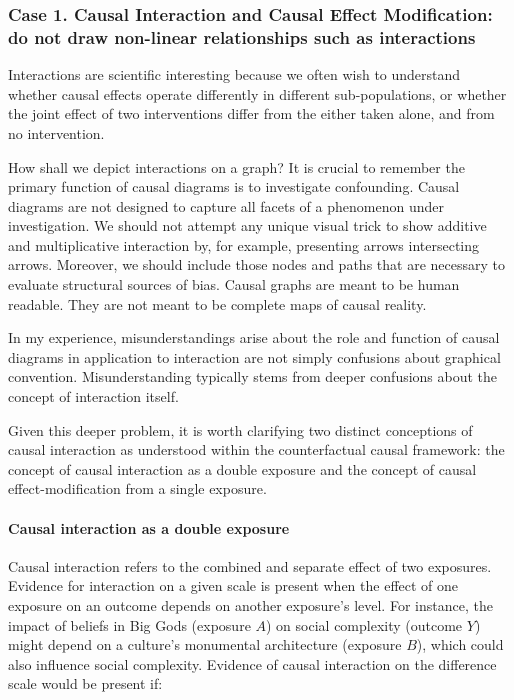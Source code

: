 \documentclass[
  singlecolumn,
  9pt]{article}
\let\oldparagraph\paragraph
\renewcommand{\paragraph}[1]{\oldparagraph{#1}\mbox{}}
\begin{document}
\subsubsection{Case 1. Causal Interaction and Causal Effect
Modification: do not draw non-linear relationships such as
interactions}\label{case-1.-causal-interaction-and-causal-effect-modification-do-not-draw-non-linear-relationships-such-as-interactions}

Interactions are scientific interesting because we often wish to
understand whether causal effects operate differently in different
sub-populations, or whether the joint effect of two interventions differ
from the either taken alone, and from no intervention.

How shall we depict interactions on a graph? It is crucial to remember
the primary function of causal diagrams is to investigate confounding.
Causal diagrams are not designed to capture all facets of a phenomenon
under investigation. We should not attempt any unique visual trick to
show additive and multiplicative interaction by, for example, presenting
arrows intersecting arrows. Moreover, we should include those nodes and
paths that are necessary to evaluate structural sources of bias. Causal
graphs are meant to be human readable. They are not meant to be complete
maps of causal reality.

In my experience, misunderstandings arise about the role and function of
causal diagrams in application to interaction are not simply confusions
about graphical convention. Misunderstanding typically stems from deeper
confusions about the concept of interaction itself.

Given this deeper problem, it is worth clarifying two distinct
conceptions of causal interaction as understood within the
counterfactual causal framework: the concept of causal interaction as a
double exposure and the concept of causal effect-modification from a
single exposure.

\paragraph{Causal interaction as a double
exposure}\label{causal-interaction-as-a-double-exposure}

Causal interaction refers to the combined and separate effect of two
exposures. Evidence for interaction on a given scale is present when the
effect of one exposure on an outcome depends on another exposure's
level. For instance, the impact of beliefs in Big Gods (exposure \(A\))
on social complexity (outcome \(Y\)) might depend on a culture's
monumental architecture (exposure \(B\)), which could also influence
social complexity. Evidence of causal interaction on the difference
scale would be present if:
\end{document}
